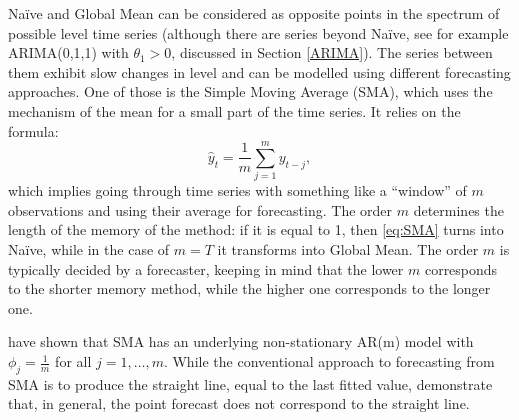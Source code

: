 \documentclass[
]{book}
\theoremstyle{definition}
\theoremstyle{definition}
\theoremstyle{definition}
\theoremstyle{definition}
\theoremstyle{remark}
\begin{document}
Naïve and Global Mean can be considered as opposite points in the spectrum of possible level time series (although there are series beyond Naïve, see for example ARIMA(0,1,1) with \(\theta_1>0\), discussed in Section \ref{ARIMA}). The series between them exhibit slow changes in level and can be modelled using different forecasting approaches. One of those is the Simple Moving Average (SMA), which uses the mechanism of the mean for a small part of the time series. It relies on the formula:
\begin{equation}
    \hat{y}_t = \frac{1}{m}\sum_{j=1}^{m} y_{t-j},
    \label{eq:SMA}
\end{equation}
which implies going through time series with something like a ``window'' of \(m\) observations and using their average for forecasting. The order \(m\) determines the length of the memory of the method: if it is equal to 1, then \eqref{eq:SMA} turns into Naïve, while in the case of \(m=T\) it transforms into Global Mean. The order \(m\) is typically decided by a forecaster, keeping in mind that the lower \(m\) corresponds to the shorter memory method, while the higher one corresponds to the longer one.

\citet{Svetunkov2017} have shown that SMA has an underlying non-stationary AR(m) model with \(\phi_j=\frac{1}{m}\) for all \(j=1, \dots, m\). While the conventional approach to forecasting from SMA is to produce the straight line, equal to the last fitted value, \citet{Svetunkov2017} demonstrate that, in general, the point forecast does not correspond to the straight line.
\end{document}
